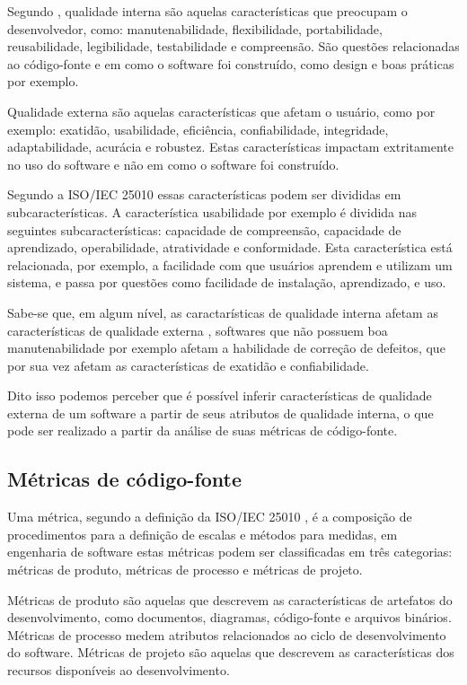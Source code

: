 \documentclass[qual, classic, a4paper]{ufbathesis}
\begin{document}
Segundo , qualidade interna são aquelas
características que preocupam o desenvolvedor, como: manutenabilidade,
flexibilidade, portabilidade, reusabilidade, legibilidade, testabilidade e
compreensão. São questões relacionadas ao código-fonte e em como o software
foi construído, como design e boas práticas por exemplo.

Qualidade externa são aquelas características que afetam o usuário, como por
exemplo: exatidão, usabilidade, eficiência, confiabilidade, integridade,
adaptabilidade, acurácia e robustez. Estas características impactam
extritamente no uso do software e não em como o software foi construído.

Segundo a ISO/IEC 25010 \cite{iso2011iec25010} essas características podem ser
divididas em subcaracterísticas. A característica usabilidade por exemplo é
dividida nas seguintes subcaracterísticas: capacidade de compreensão,
capacidade de aprendizado, operabilidade, atratividade e conformidade. Esta
característica está relacionada, por exemplo, a facilidade com que usuários aprendem e
utilizam um sistema, e passa por questões como facilidade de instalação,
aprendizado, e uso.

Sabe-se que, em algum nível, as caractarísticas de qualidade interna afetam as
características de qualidade externa \cite{McConnell2004}, softwares que não
possuem boa manutenabilidade por exemplo afetam a habilidade de correção de
defeitos, que por sua vez afetam as características de exatidão e
confiabilidade.

Dito isso podemos perceber que é possível inferir características de qualidade
externa de um software a partir de seus atributos de qualidade interna, o que
pode ser realizado a partir da análise de suas métricas de código-fonte.

\subsection{Métricas de código-fonte}

Uma métrica, segundo a definição da ISO/IEC 25010 \cite{iso2011iec25010}, é a
composição de procedimentos para a definição de escalas e métodos para
medidas, em engenharia de software estas métricas podem ser classificadas em três categorias: métricas de
produto, métricas de processo e métricas de projeto.

Métricas de produto são aquelas que
descrevem as características de artefatos do desenvolvimento, como documentos,
diagramas, código-fonte e arquivos binários. Métricas de processo medem atributos relacionados
ao ciclo de desenvolvimento do software. Métricas de projeto são aquelas
que descrevem as características dos recursos disponíveis ao desenvolvimento.
\end{document}
